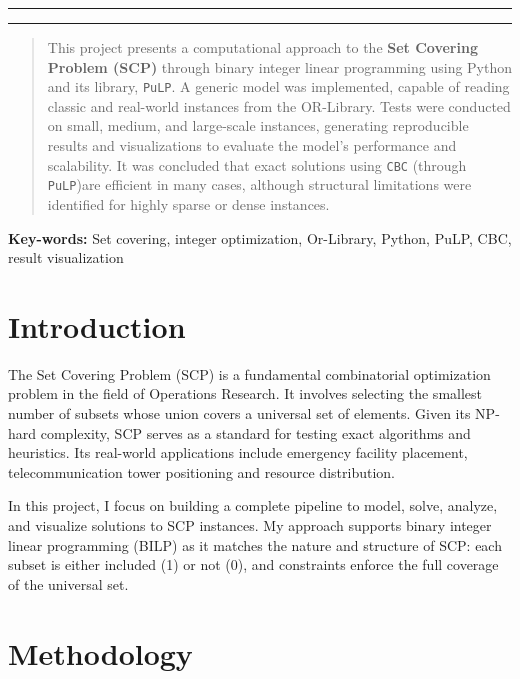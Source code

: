 \documentclass[11pt,letterpaper]{article}
\begin{document}

\rule{17cm}{0.1mm}

\authorrowone
  {}

\rule{17cm}{0.1mm}

\begin{abstract}
This project presents a computational approach to the \textbf{Set Covering Problem (SCP)} through binary integer linear programming using Python and its library, \texttt{PuLP}. A generic model was implemented, capable of reading classic and real-world instances from the OR-Library. Tests were conducted on small, medium, and large-scale instances, generating reproducible results and visualizations to evaluate the model's performance and scalability. It was concluded that exact solutions using \texttt{CBC} (through \texttt{PuLP})are efficient in many cases, although structural limitations were identified for highly sparse or dense instances.
\end{abstract}

\smallskip
\noindent\textbf{Key-words:} Set covering, integer optimization, Or-Library, Python, PuLP, CBC, result visualization

\section*{Introduction}
The Set Covering Problem (SCP) is a fundamental combinatorial optimization problem in the field of Operations Research. It involves selecting the smallest number of subsets whose union covers a universal set of elements. Given its NP-hard complexity, SCP serves as a standard for testing exact algorithms and heuristics. Its real-world applications include emergency facility placement, telecommunication tower positioning and resource distribution.

In this project, I focus on building a complete pipeline to model, solve, analyze, and visualize solutions to SCP instances. My approach supports binary integer linear programming (BILP) as it matches the nature and structure of SCP: each subset is either included (1) or not (0), and constraints enforce the full coverage of the universal set.

\section*{Methodology}
\end{document}
